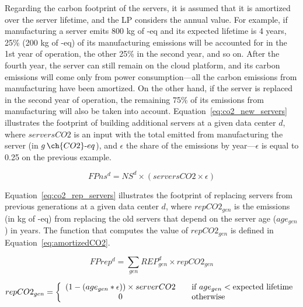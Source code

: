 Regarding the carbon footprint of the servers, it is assumed that it is amortized over the server lifetime, and the LP considers the annual value. For example, if manufacturing a server emits 800 kg of -eq and its expected lifetime is 4 years, 25\% (200 kg of -eq) of its manufacturing emissions will be accounted for in the 1st year of operation, the other 25\% in the second year, and so on. After the fourth year, the server can still remain on the cloud platform, and its carbon emissions will come only from power consumption---all the carbon emissions from manufacturing have been amortized. On the other hand, if the server is replaced in the second year of operation, the remaining 75\%  of its emissions from manufacturing will also be taken into account. Equation~\eqref{eq:co2_new_servers} illustrates the footprint of building additional servers at a given data center $d$, where $serversCO2$ is an input with the total  emitted from manufacturing the server (in $g\,\ch{CO2}\text{-}eq$), and $\epsilon$ the share of the emissions by year---$\epsilon$ is equal to 0.25 on the previous example.

\begin{equation} \label{eq:co2_new_servers}
FPns^d = NS^d \times (serversCO2 \times \epsilon)	
\end{equation}

Equation~\eqref{eq:co2_rep_servers} illustrates the footprint of replacing servers from previous generations at a given data center $d$, where $repCO2_{gen}$ is the emissions (in kg of -eq) from replacing the old servers that depend on the server age ($age_{gen}$) in years. The function that computes the value of  $repCO2_{gen}$  is defined in Equation~\eqref{eq:amortizedCO2}.

\begin{equation} \label{eq:co2_rep_servers}
FPrep^d = \sum_{gen} REP_{gen}^d  \times repCO2_{gen}
\end{equation}


\begin{equation} \label{eq:amortizedCO2}
repCO2_{gen} =  \left\{ 
  \begin{array}{ c l }
    (1 - (age_{gen} * \epsilon)) \times serverCO2   & \quad \textrm{if $age_{gen}$}  <  \textrm{expected lifetime}      \\
    0     & \quad  \textrm{otherwise}   \\
  \end{array}
\right.
\end{equation}


